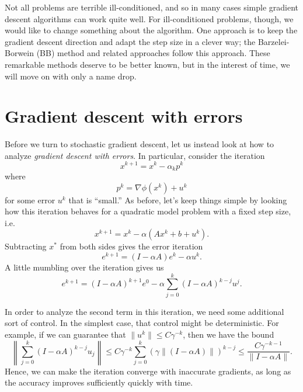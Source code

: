 \documentclass[12pt, leqno]{article} %
\begin{document}
Not all problems are terrible ill-conditioned, and so in many cases
simple gradient descent algorithms can work quite well.  For
ill-conditioned problems, though, we would like to change something
about the algorithm.  One approach is to keep the gradient descent
direction and adapt the step size in a clever way; the
Barzelei-Borwein (BB) method and related approaches follow this
approach.  These remarkable methods deserve to be better known,
but in the interest of time, we will move on with only a name drop.

\section{Gradient descent with errors}

Before we turn to stochastic gradient descent, let us instead look at
how to analyze {\em gradient descent with errors}.  In particular,
consider the iteration
\[
  x^{k+1} = x^k - \alpha_k p^k
\]
where
\[
  p^k = \nabla \phi(x^k) + u^k
\]
for some error $u^k$ that is ``small.''  As before, let's keep things
simple by looking how this iteration behaves for a quadratic model
problem with a fixed step size, i.e.
\[
  x^{k+1} = x^k - \alpha (Ax^k + b + u^k).
\]
Subtracting $x^*$ from both sides gives the error iteration
\[
  e^{k+1} = (I-\alpha A) e^k - \alpha u^k.
\]  
A little mumbling over the iteration gives us
\[
  e^{k+1} = (I-\alpha A)^{k+1} e^0 - \alpha \sum_{j=0}^k (I-\alpha A)^{k-j} u^j.
\]

In order to analyze the second term in this iteration, we need some
additional sort of control.  In the simplest case, that control might
be deterministic.  For example, if we can guarantee that
$\|u^k\| \leq C \gamma^{-k}$, then we have the bound
\[
  \left\| \sum_{j=0}^k  (I-\alpha A)^{k-j} u_j \right\| \leq
  C \gamma^{-k} \sum_{j=0}^k \left( \gamma \|(I-\alpha A)\|\right)^{k-j} \leq
  \frac{C \gamma^{-k-1}}{\|I-\alpha A\|}.
\]
Hence, we can make the iteration converge with inaccurate gradients,
as long as the accuracy improves sufficiently quickly with time.
\end{document}

